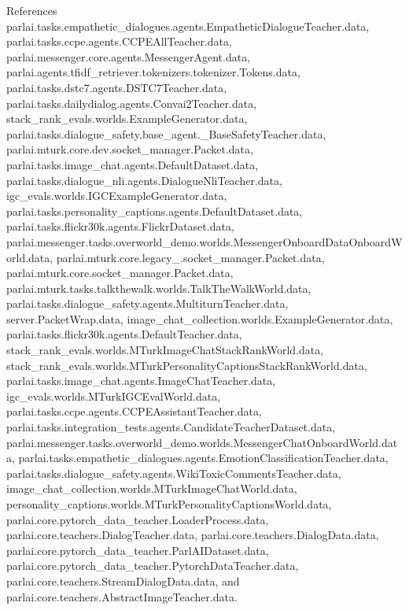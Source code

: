 References parlai.\+tasks.\+empathetic\+\_\+dialogues.\+agents.\+Empathetic\+Dialogue\+Teacher.\+data, parlai.\+tasks.\+ccpe.\+agents.\+C\+C\+P\+E\+All\+Teacher.\+data, parlai.\+messenger.\+core.\+agents.\+Messenger\+Agent.\+data, parlai.\+agents.\+tfidf\+\_\+retriever.\+tokenizers.\+tokenizer.\+Tokens.\+data, parlai.\+tasks.\+dstc7.\+agents.\+D\+S\+T\+C7\+Teacher.\+data, parlai.\+tasks.\+dailydialog.\+agents.\+Convai2\+Teacher.\+data, stack\+\_\+rank\+\_\+evals.\+worlds.\+Example\+Generator.\+data, parlai.\+tasks.\+dialogue\+\_\+safety.\+base\+\_\+agent.\+\_\+\+Base\+Safety\+Teacher.\+data, parlai.\+mturk.\+core.\+dev.\+socket\+\_\+manager.\+Packet.\+data, parlai.\+tasks.\+image\+\_\+chat.\+agents.\+Default\+Dataset.\+data, parlai.\+tasks.\+dialogue\+\_\+nli.\+agents.\+Dialogue\+Nli\+Teacher.\+data, igc\+\_\+evals.\+worlds.\+I\+G\+C\+Example\+Generator.\+data, parlai.\+tasks.\+personality\+\_\+captions.\+agents.\+Default\+Dataset.\+data, parlai.\+tasks.\+flickr30k.\+agents.\+Flickr\+Dataset.\+data, parlai.\+messenger.\+tasks.\+overworld\+\_\+demo.\+worlds.\+Messenger\+Onboard\+Data\+Onboard\+World.\+data, parlai.\+mturk.\+core.\+legacy\+\_.\+socket\+\_\+manager.\+Packet.\+data, parlai.\+mturk.\+core.\+socket\+\_\+manager.\+Packet.\+data, parlai.\+mturk.\+tasks.\+talkthewalk.\+worlds.\+Talk\+The\+Walk\+World.\+data, parlai.\+tasks.\+dialogue\+\_\+safety.\+agents.\+Multiturn\+Teacher.\+data, server.\+Packet\+Wrap.\+data, image\+\_\+chat\+\_\+collection.\+worlds.\+Example\+Generator.\+data, parlai.\+tasks.\+flickr30k.\+agents.\+Default\+Teacher.\+data, stack\+\_\+rank\+\_\+evals.\+worlds.\+M\+Turk\+Image\+Chat\+Stack\+Rank\+World.\+data, stack\+\_\+rank\+\_\+evals.\+worlds.\+M\+Turk\+Personality\+Captions\+Stack\+Rank\+World.\+data, parlai.\+tasks.\+image\+\_\+chat.\+agents.\+Image\+Chat\+Teacher.\+data, igc\+\_\+evals.\+worlds.\+M\+Turk\+I\+G\+C\+Eval\+World.\+data, parlai.\+tasks.\+ccpe.\+agents.\+C\+C\+P\+E\+Assistant\+Teacher.\+data, parlai.\+tasks.\+integration\+\_\+tests.\+agents.\+Candidate\+Teacher\+Dataset.\+data, parlai.\+messenger.\+tasks.\+overworld\+\_\+demo.\+worlds.\+Messenger\+Chat\+Onboard\+World.\+data, parlai.\+tasks.\+empathetic\+\_\+dialogues.\+agents.\+Emotion\+Classification\+Teacher.\+data, parlai.\+tasks.\+dialogue\+\_\+safety.\+agents.\+Wiki\+Toxic\+Comments\+Teacher.\+data, image\+\_\+chat\+\_\+collection.\+worlds.\+M\+Turk\+Image\+Chat\+World.\+data, personality\+\_\+captions.\+worlds.\+M\+Turk\+Personality\+Captions\+World.\+data, parlai.\+core.\+pytorch\+\_\+data\+\_\+teacher.\+Loader\+Process.\+data, parlai.\+core.\+teachers.\+Dialog\+Teacher.\+data, parlai.\+core.\+teachers.\+Dialog\+Data.\+data, parlai.\+core.\+pytorch\+\_\+data\+\_\+teacher.\+Parl\+A\+I\+Dataset.\+data, parlai.\+core.\+pytorch\+\_\+data\+\_\+teacher.\+Pytorch\+Data\+Teacher.\+data, parlai.\+core.\+teachers.\+Stream\+Dialog\+Data.\+data, and parlai.\+core.\+teachers.\+Abstract\+Image\+Teacher.\+data.



